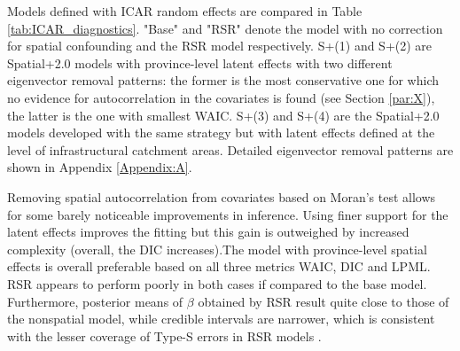 \documentclass{book}
\begin{document}
 
 



Models defined with ICAR random effects are compared in Table \ref{tab:ICAR_diagnostics}. "Base" and "RSR" denote the model with no correction for spatial confounding and the RSR model respectively.
S+(1) and S+(2) are Spatial+2.0 models with province-level latent effects with two different eigenvector removal patterns: the former is the most conservative one for which no evidence for autocorrelation in the covariates is found (see Section \ref{par:X}), the latter is the one with smallest WAIC.
S+(3) and S+(4) are the Spatial+2.0 models developed with the same strategy but with latent effects defined at the level of infrastructural catchment areas. Detailed eigenvector removal patterns are shown in Appendix \ref{Appendix:A}.

Removing spatial autocorrelation from covariates based on Moran's test allows for some barely noticeable improvements in inference. Using finer support for the latent effects improves the fitting but this gain is outweighed by increased complexity (overall, the DIC increases).The model with province-level spatial effects is overall preferable based on all three metrics WAIC, DIC and LPML.
%
RSR appears to perform poorly in both cases if compared to the base model. Furthermore, posterior means of $\beta$ obtained by RSR result quite close to those of the nonspatial model, while credible intervals are narrower, which is consistent with the lesser coverage of Type-S errors in RSR models \citep{Khan}. 
\end{document}
